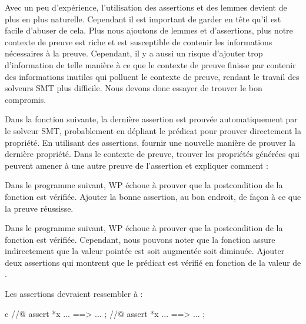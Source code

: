 Avec un peu d'expérience, l'utilisation des assertions et des lemmes devient de
plus en plus naturelle. Cependant il est important de garder en tête qu'il est
facile d'abuser de cela. Plus nous ajoutons de lemmes et d'assertions, plus notre
contexte de preuve est riche et est susceptible de contenir les informations
nécessaires à la preuve. Cependant, il y a aussi un risque d'ajouter trop
d'information de telle manière à ce que le contexte de preuve finisse par contenir
des informations inutiles qui polluent le contexte de preuve, rendant le travail
des solveurs SMT plus difficile. Nous devons donc essayer de trouver le bon
compromis.






Dans la fonction suivante, la dernière assertion est prouvée automatiquement
par le solveur SMT, probablement en dépliant le prédicat pour prouver
directement la propriété. En utilisant des assertions, fournir une nouvelle
manière de prouver la dernière propriété. Dans le contexte de preuve, trouver
les propriétés générées qui peuvent amener à une autre preuve de l'assertion
et expliquer comment :






Dans le programme suivant, WP échoue à prouver que la postcondition de la
fonction  est vérifiée. Ajouter la bonne assertion, au bon endroit,
de façon à ce que la preuve réussisse.






Dans le programme suivant, WP échoue à prouver que la postcondition de la
fonction  est vérifiée. Cependant, nous pouvons noter
que la fonction  assure indirectement que la valeur pointée
est soit augmentée soit diminuée. Ajouter deux assertions qui montrent que
le prédicat est vérifié en fonction de la valeur de .




Les assertions devraient ressembler à :


\begin{CodeBlock}{c}
//@ assert *x ... ==> ... ;
//@ assert *x ... ==> ... ;
\end{CodeBlock}


